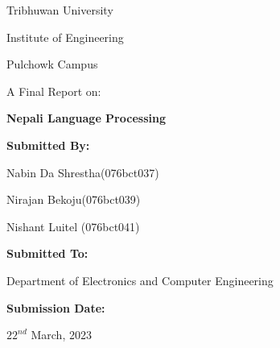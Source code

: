 \bigskip
\bigskip
\bigskip
\bigskip

\begin{center}

Tribhuwan University

Institute of Engineering

Pulchowk Campus

\bigskip
\bigskip
\bigskip
\bigskip
\bigskip
\bigskip
\bigskip
\bigskip

\noindent\makebox[\linewidth]
{\rule{15cm}{0.4pt}}
A Final Report on:

\textbf{\large Nepali Language Processing}
\noindent\makebox[\linewidth]
{\rule{15cm}{0.4pt}}

\bigskip
\bigskip
\bigskip
\bigskip
\bigskip
\bigskip
\bigskip
\bigskip
\textbf{Submitted By:}

Nabin Da Shrestha(076bct037)

Nirajan Bekoju(076bct039)

Nishant Luitel (076bct041)

\bigskip
\bigskip
\bigskip
\bigskip
\textbf{Submitted To:}

Department of Electronics and Computer Engineering

\bigskip
\bigskip
\bigskip
\bigskip
\textbf{Submission Date:} 

$22^{nd}$ March, 2023

\end{center}

